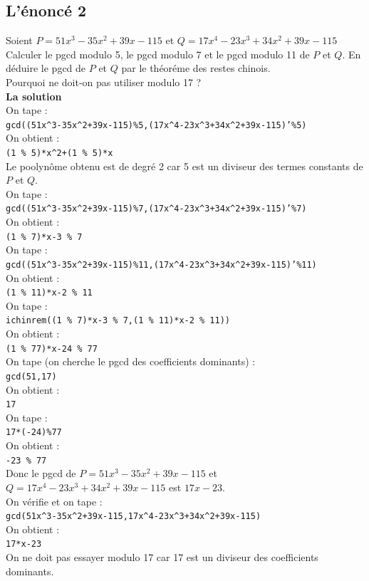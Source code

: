 \documentclass[a4paper,11pt]{book}
\begin{document}
\subsection{L'\'enonc\'e 2}
Soient $P=51x^3-35x^2+39x-115$ et $Q=17x^4-23x^3+34x^2+39x-115$
Calculer le pgcd modulo 5, le pgcd modulo 7 et le pgcd modulo 11 de $P$ et $Q$.
En d\'eduire le pgcd de $P$ et $Q$ par le th\'eor\'eme des restes chinois.\\
Pourquoi ne doit-on pas utiliser modulo 17 ?\\
{\bf La solution}\\
On tape :\\
{\tt gcd((51x\verb|^|3-35x\verb|^|2+39x-115)\%5,(17x\verb|^|4-23x\verb|^|3+34x\verb|^|2+39x-115)'\%5)} \\
On obtient :\\
{\tt (1 \% 5)*x\verb|^|2+(1 \% 5)*x}\\
Le poolyn\^ome obtenu est de degr\'e 2 car 5 est un diviseur des termes 
constants de $P$ et $Q$.\\
On tape :\\
{\tt gcd((51x\verb|^|3-35x\verb|^|2+39x-115)\%7,(17x\verb|^|4-23x\verb|^|3+34x\verb|^|2+39x-115)'\%7)} \\
On obtient :\\
{\tt (1 \% 7)*x-3 \% 7}\\
On tape :\\
{\tt gcd((51x\verb|^|3-35x\verb|^|2+39x-115)\%11,(17x\verb|^|4-23x\verb|^|3+34x\verb|^|2+39x-115)'\%11)} \\
On obtient :\\
{\tt (1 \% 11)*x-2 \% 11}\\
On tape :\\
{\tt ichinrem((1 \% 7)*x-3 \% 7,(1 \% 11)*x-2 \% 11))}\\
On obtient :\\
{\tt (1 \% 77)*x-24 \% 77}\\
On tape (on cherche le pgcd des coefficients dominants) :\\
{\tt gcd(51,17)}\\
On obtient :\\
{\tt 17}\\
On tape :\\
{\tt 17*(-24)\%77}\\
On obtient :\\
{\tt -23 \% 77}\\
Donc le pgcd de $P=51x^3-35x^2+39x-115$ et $Q=17x^4-23x^3+34x^2+39x-115$ est 
$17x-23$.\\
On v\'erifie et on tape :\\
{\tt gcd(51x\verb|^|3-35x\verb|^|2+39x-115,17x\verb|^|4-23x\verb|^|3+34x\verb|^|2+39x-115)}\\
On obtient :\\
{\tt 17*x-23}\\
On ne doit pas essayer modulo 17 car 17 est un diviseur des coefficients 
dominants.
\end{document}
